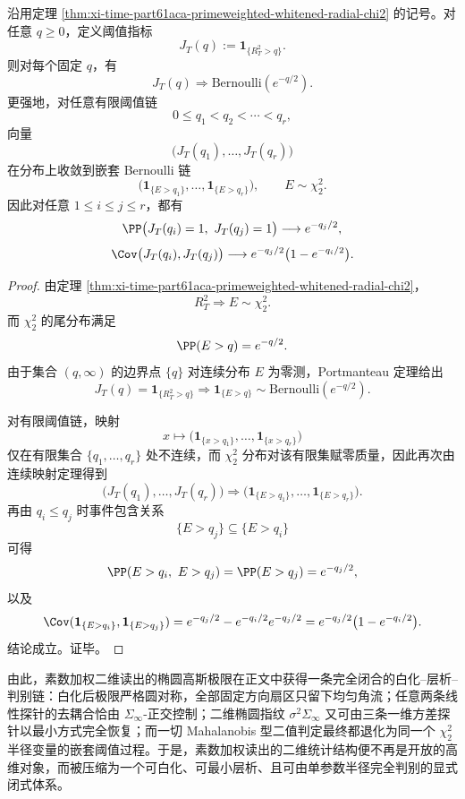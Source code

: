 \begin{theorem}\label{thm:xi-time-part61aca-primeweighted-mahalanobis-threshold-bernoulli-chain}
沿用定理 \ref{thm:xi-time-part61aca-primeweighted-whitened-radial-chi2} 的记号。对任意 \(q\ge 0\)，定义阈值指标
\[
J_T(q):=\mathbf 1_{\{R_T^2>q\}}.
\]
则对每个固定 \(q\)，有
\[
J_T(q)\Longrightarrow \mathrm{Bernoulli}(e^{-q/2}).
\]
更强地，对任意有限阈值链
\[
0\le q_1<q_2<\cdots<q_r,
\]
向量
\[
\bigl(J_T(q_1),\dots,J_T(q_r)\bigr)
\]
在分布上收敛到嵌套 Bernoulli 链
\[
\bigl(\mathbf 1_{\{E>q_1\}},\dots,\mathbf 1_{\{E>q_r\}}\bigr),
\qquad
E\sim \chi_2^2.
\]
因此对任意 \(1\le i\le j\le r\)，都有
\[
\PP\bigl(J_T(q_i)=1,\ J_T(q_j)=1\bigr)\longrightarrow e^{-q_j/2},
\]
\[
\Cov\bigl(J_T(q_i),J_T(q_j)\bigr)\longrightarrow
e^{-q_j/2}\bigl(1-e^{-q_i/2}\bigr).
\]
\end{theorem}
\begin{proof}
由定理 \ref{thm:xi-time-part61aca-primeweighted-whitened-radial-chi2}，
\[
R_T^2\Longrightarrow E\sim \chi_2^2.
\]
而 \(\chi_2^2\) 的尾分布满足
\[
\PP(E>q)=e^{-q/2}.
\]
由于集合 \((q,\infty)\) 的边界点 \(\{q\}\) 对连续分布 \(E\) 为零测，Portmanteau 定理给出
\[
J_T(q)=\mathbf 1_{\{R_T^2>q\}}
\Longrightarrow
\mathbf 1_{\{E>q\}}
\sim \mathrm{Bernoulli}(e^{-q/2}).
\]

对有限阈值链，映射
\[
x\longmapsto
\bigl(\mathbf 1_{\{x>q_1\}},\dots,\mathbf 1_{\{x>q_r\}}\bigr)
\]
仅在有限集合 \(\{q_1,\dots,q_r\}\) 处不连续，而 \(\chi_2^2\) 分布对该有限集赋零质量，因此再次由连续映射定理得到
\[
\bigl(J_T(q_1),\dots,J_T(q_r)\bigr)
\Longrightarrow
\bigl(\mathbf 1_{\{E>q_1\}},\dots,\mathbf 1_{\{E>q_r\}}\bigr).
\]
再由 \(q_i\le q_j\) 时事件包含关系
\[
\{E>q_j\}\subseteq \{E>q_i\}
\]
可得
\[
\PP(E>q_i,\ E>q_j)=\PP(E>q_j)=e^{-q_j/2},
\]
以及
\[
\Cov(\mathbf 1_{\{E>q_i\}},\mathbf 1_{\{E>q_j\}})
=
e^{-q_j/2}-e^{-q_i/2}e^{-q_j/2}
=
e^{-q_j/2}\bigl(1-e^{-q_i/2}\bigr).
\]
结论成立。证毕。
\end{proof}

\noindent
由此，素数加权二维读出的椭圆高斯极限在正文中获得一条完全闭合的白化--层析--判别链：白化后极限严格圆对称，全部固定方向扇区只留下均匀角流；任意两条线性探针的去耦合恰由 \(\Sigma_\infty\)-正交控制；二维椭圆指纹 \(\sigma^2\Sigma_\infty\) 又可由三条一维方差探针以最小方式完全恢复；而一切 Mahalanobis 型二值判定最终都退化为同一个 \(\chi_2^2\) 半径变量的嵌套阈值过程。于是，素数加权读出的二维统计结构便不再是开放的高维对象，而被压缩为一个可白化、可最小层析、且可由单参数半径完全判别的显式闭式体系。

\endinput
